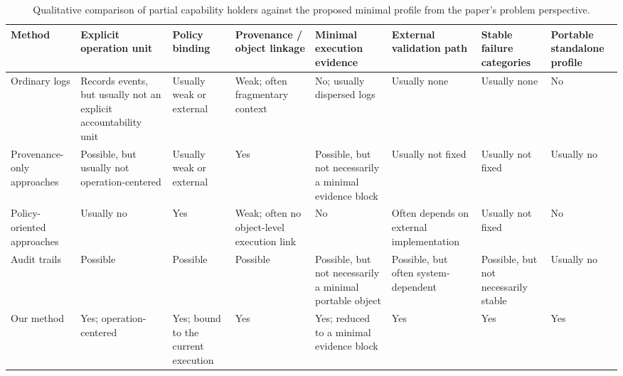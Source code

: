 \begin{table}[t]
\centering
\scriptsize
\setlength{\tabcolsep}{3pt}
\renewcommand{\arraystretch}{1.15}
\caption{Qualitative comparison of partial capability holders against the proposed minimal profile from the paper's problem perspective.}
\label{tab:method-comparison}
\begin{tabularx}{\linewidth}{P{1.65cm}YYYYYYY}
\toprule
Method &
Explicit operation unit &
Policy binding &
Provenance / object linkage &
Minimal execution evidence &
External validation path &
Stable failure categories &
Portable standalone profile \\
\midrule
Ordinary logs &
Records events, but usually not an explicit accountability unit &
Usually weak or external &
Weak; often fragmentary context &
No; usually dispersed logs &
Usually none &
Usually none &
No \\
Provenance-only approaches &
Possible, but usually not operation-centered &
Usually weak or external &
Yes &
Possible, but not necessarily a minimal evidence block &
Usually not fixed &
Usually not fixed &
Usually no \\
Policy-oriented approaches &
Usually no &
Yes &
Weak; often no object-level execution link &
No &
Often depends on external implementation &
Usually not fixed &
No \\
Audit trails &
Possible &
Possible &
Possible &
Possible, but not necessarily a minimal portable object &
Possible, but often system-dependent &
Possible, but not necessarily stable &
Usually no \\
Our method &
Yes; operation-centered &
Yes; bound to the current execution &
Yes &
Yes; reduced to a minimal evidence block &
Yes &
Yes &
Yes \\
\bottomrule
\end{tabularx}
\end{table}
